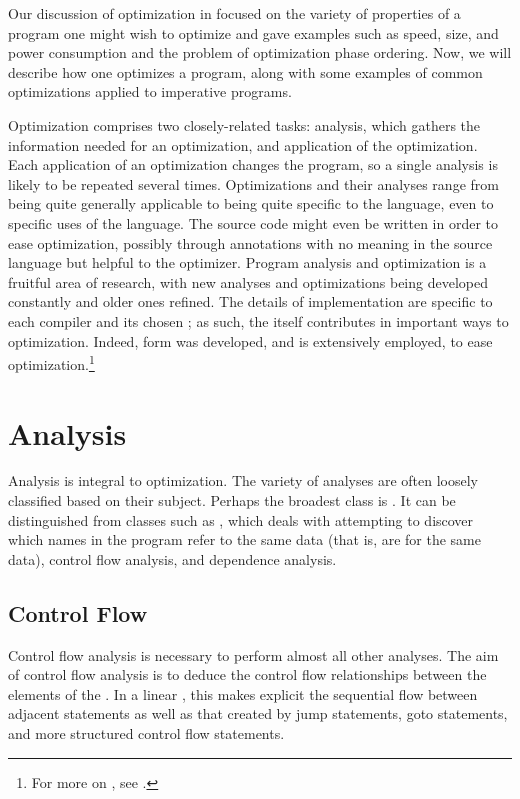 \label{imperative:optimizing}
Our discussion of optimization in  focused on the variety of properties of a program one might wish to optimize and gave examples such as speed, size, and power consumption and the problem of optimization phase ordering. Now, we will describe how one optimizes a program, along with some examples of common optimizations applied to imperative programs.

Optimization comprises two closely-related tasks: analysis, which gathers the information needed for an optimization, and application of the optimization. Each application of an optimization changes the program, so a single analysis is likely to be repeated several times. Optimizations and their analyses range from being quite generally applicable to being quite specific to the language, even to specific uses of the language. The source code might even be written in order to ease optimization, possibly through annotations with no meaning in the source language but helpful to the optimizer. Program analysis and optimization is a fruitful area of research, with new analyses and optimizations being developed constantly and older ones refined. The details of implementation are specific to each compiler and its chosen \IRs{}; as such, the \IR itself contributes in important ways to optimization. Indeed, \SSA[long] form was developed, and is extensively employed, to ease optimization.\footnote{For more on \SSA{}, see .}%

\section{Analysis}
Analysis is integral to optimization. The variety of analyses are often loosely classified based on their subject. Perhaps the broadest class is . It can be distinguished from classes such as , which deals with attempting to discover which names in the program refer to the same data (that is, are  for the same data), control flow analysis, and dependence analysis.

\subsection{Control Flow}
Control flow analysis is necessary to perform almost all other analyses. The aim of control flow analysis is to deduce the control flow relationships between the elements of the \IR{}. In a linear , this makes explicit the sequential flow between adjacent statements as well as that created by jump statements, goto statements, and more structured control flow statements.

